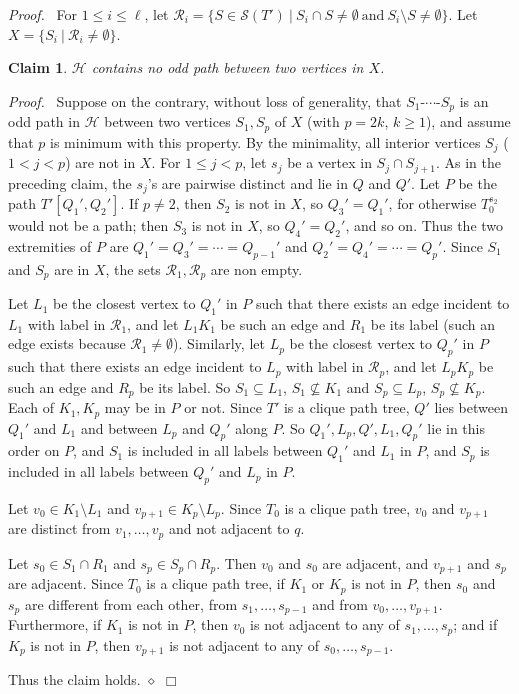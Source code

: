 \documentclass[11pt]{article}
\newtheorem{claim}{Claim}
\newenvironment{proof}{\noindent \emph{Proof.}\ }{\hfill
    $\Box$\vspace{1em}}
\newenvironment{proofcl}{\noindent \emph{Proof.}\ }{Thus the claim
holds.  \hfill $\diamond$\vspace{1em}}
\begin{document}
\begin{proof}
For $1\leq i\leq \ell$, let $\mathcal R_i=\{S\in \mathcal S(T')\ |\
S_i\cap S \neq \emptyset\ \textrm{and}\ S_i\setminus S\neq
\emptyset\}$.  Let $X=\{S_i\ |\ \mathcal R_i\neq \emptyset\}$.
\begin{claim}
$\mathcal H$ contains no odd path between two vertices in $X$.
\end{claim}
\begin{proofcl}
Suppose on the contrary, without loss of generality, that
$S_1$-$\cdots$-$S_p$ is an odd path in $\mathcal H$ between two
vertices $S_1, S_p$ of $X$ (with $p=2k$, $k\geq 1$), and assume that
$p$ is minimum with this property.  By the minimality, all interior
vertices $S_{j}$ ($1<j<p$) are not in $X$.  For $1\leq j<p$, let $s_j$
be a vertex in $S_{j}\cap S_{j+1}$.  As in the preceding claim, the
$s_j$'s are pairwise distinct and lie in $Q$ and $Q'$.  Let $P$ be the
path $T'[Q_1', Q_2']$.  If $p\neq 2$, then $S_2$ is not in $X$, so
$Q_3'=Q_1'$, for otherwise $T_0^{s_2}$ would not be a path; then $S_3$
is not in $X$, so $Q_{4}'=Q_2'$, and so on.  Thus the two extremities
of $P$ are $Q_1'=Q_3'= \cdots = Q_{p-1}'$ and $Q_2'=Q_{4}'= \cdots =
Q_p'$.  Since $S_1$ and $S_p$ are in $X$, the sets $\mathcal R_1,
\mathcal R_p$ are non empty.



Let $L_1$ be the closest vertex to $Q_1'$ in $P$ such that there
exists an edge incident to $L_1$ with label in $\mathcal R_1$, and let
$L_1K_1$ be such an edge and $R_1$ be its label (such an edge exists
because $\mathcal R_1\neq\emptyset$).  Similarly, let $L_p$ be the
closest vertex to $Q_p'$ in $P$ such that there exists an edge
incident to $L_p$ with label in $\mathcal R_p$, and let $L_pK_p$ be
such an edge and $R_p$ be its label.  So $S_1 \subseteq L_1$,
$S_1\nsubseteq K_1$ and $S_p \subseteq L_p$, $S_p \nsubseteq K_p$.
Each of $K_1, K_p$ may be in $P$ or not.  Since $T'$ is a clique path
tree, $Q'$ lies between $Q_1'$ and $L_1$ and between $L_p$ and $Q_p'$
along $P$.  So $Q_1', L_p, Q', L_1, Q_p'$ lie in this order on $P$,
and $S_1$ is included in all labels between $Q_1'$ and $L_1$ in $P$,
and $S_p$ is included in all labels between $Q_p'$ and $L_p$ in $P$.

Let $v_0 \in K_1\setminus L_1$ and $v_{p+1} \in K_p\setminus L_p$.
Since $T_0$ is a clique path tree, $v_0$ and $v_{p+1}$ are
distinct from $v_1, \ldots, v_p$ and not adjacent to $q$.

Let $s_0 \in S_1\cap R_1$ and $s_p \in S_p\cap R_p$.  Then $v_0$ and
$s_0$ are adjacent, and $v_{p+1}$ and $s_p$ are adjacent.  Since $T_0$
is a clique path tree, if $K_1$ or $K_p$ is not in $P$, then $s_0$ and
$s_p$ are different from each other, from $s_1, \ldots, s_{p-1}$ and
from $v_0, \ldots, v_{p+1}$.  Furthermore, if $K_1$ is not in $P$,
then $v_0$ is not adjacent to any of $s_1, \ldots, s_p$; and if $K_p$
is not in $P$, then $v_{p+1}$ is not adjacent to any of $s_0, \ldots,
s_{p-1}$.


\end{proofcl}
\end{proof}
\end{document}
